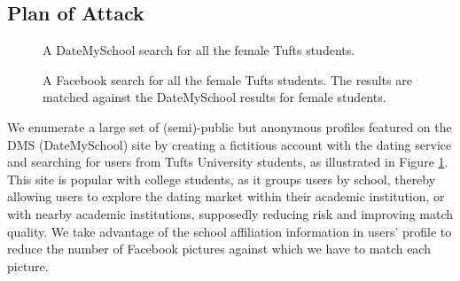 \subsection{Plan of Attack}
\label{sec:intro_plan_of_attack}

\begin{figure}[hbtp]
  \caption{
    A DateMySchool search for all the female Tufts students.
  }
  \label{fig:dms_search}
\end{figure}

\begin{figure}[hbtp]
  \caption{
    A Facebook search for all the female Tufts students. The results are
    matched against the DateMySchool results for female students.
  }
  \label{fig:fb_search}
\end{figure}

We enumerate a large set of (semi)-public but anonymous profiles featured on the DMS (DateMySchool\cite{dms2014}) site by creating a fictitious account with the dating service and searching for users from Tufts University students, as illustrated in Figure \ref{fig:dms_search}.
This site is popular with college students, as it groups users by school, thereby allowing users to explore the dating market within their academic institution, or with nearby academic institutions, supposedly reducing risk and improving match quality. We take advantage of the school affiliation information in users' profile to reduce the number of Facebook pictures against which we have to match each picture.

